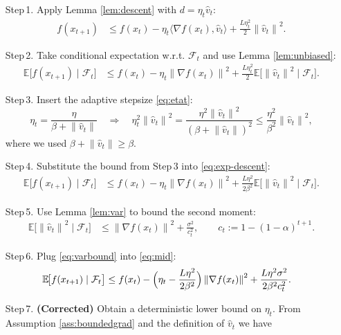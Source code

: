\documentclass{article}
\newcommand{\E}{\mathbb{E}}
\newcommand{\norm}[1]{\left\lVert#1\right\rVert}
\begin{document}
\begin{enumerate}
\item[Step 1.] Apply Lemma \ref{lem:descent} with $d=\eta_t\hat v_t$:
\begin{align}
f(x_{t+1}) &\le f(x_t)-\eta_t\langle\nabla f(x_t),\hat v_t\rangle
            +\frac{L\eta_t^{2}}{2}\norm{\hat v_t}^{2}. \label{eq:descent}
\end{align}
\item[Step 2.] Take conditional expectation w.r.t. $\mathcal{F}_t$ and use Lemma \ref{lem:unbiased}:
\begin{align}
\E\!\big[f(x_{t+1})\mid\mathcal{F}_t\big]
&\le f(x_t)-\eta_t\norm{\nabla f(x_t)}^{2}
   +\frac{L\eta_t^{2}}{2}\E\!\big[\norm{\hat v_t}^{2}\mid\mathcal{F}_t\big].
   \label{eq:exp-descent}
\end{align}
\item[Step 3.] Insert the adaptive stepsize \eqref{eq:etat}:
\[
\eta_t=\frac{\eta}{\beta+\norm{\hat v_t}}
\quad\Longrightarrow\quad
\eta_t^{2}\norm{\hat v_t}^{2}
= \frac{\eta^{2}\norm{\hat v_t}^{2}}{(\beta+\norm{\hat v_t})^{2}}
\le \frac{\eta^{2}}{\beta^{2}}\norm{\hat v_t}^{2},
\]
where we used $\beta+\norm{\hat v_t}\ge\beta$.
\item[Step 4.] Substitute the bound from Step 3 into \eqref{eq:exp-descent}:
\begin{align}
\E\!\big[f(x_{t+1})\mid\mathcal{F}_t\big]
&\le f(x_t)-\eta_t\norm{\nabla f(x_t)}^{2}
   +\frac{L\eta^{2}}{2\beta^{2}}
     \E\!\big[\norm{\hat v_t}^{2}\mid\mathcal{F}_t\big].
   \label{eq:mid}
\end{align}
\item[Step 5.] Use Lemma \ref{lem:var} to bound the second moment:
\begin{align}
\E\!\big[\norm{\hat v_t}^{2}\mid\mathcal{F}_t\big]
&\le \norm{\nabla f(x_t)}^{2}
   +\frac{\sigma^{2}}{c_t^{2}},\qquad
c_t:=1-(1-\alpha)^{t+1}. \label{eq:varbound}
\end{align}
\item[Step 6.] Plug \eqref{eq:varbound} into \eqref{eq:mid}:
\begin{align}
\E\!\big[f(x_{t+1})\mid\mathcal{F}_t\big]
&\le f(x_t)-\Bigl(\eta_t-\frac{L\eta^{2}}{2\beta^{2}}\Bigr)\norm{\nabla f(x_t)}^{2}
   +\frac{L\eta^{2}\sigma^{2}}{2\beta^{2}c_t^{2}} .
   \label{eq:aftervar}
\end{align}
\item[Step 7.] \textbf{(Corrected)} Obtain a deterministic lower bound on $\eta_t$.
From Assumption \ref{ass:boundedgrad} and the definition of $\hat v_t$ we have

\end{enumerate}
\end{document}

